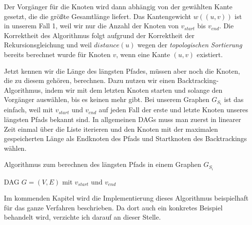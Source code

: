 Der Vorgänger für die Knoten wird dann abhängig von der gewählten Kante gesetzt, die die größte Gesamtlänge liefert. Das Kantengewicht $w((u,v))$ ist in unserem Fall 1, weil wir nur die Anzahl der Knoten von $v_{start}$ bis $v_{end}$. Die Korrektheit des Algorithmus folgt aufgrund der Korrektheit der Rekursionsgleichung und weil $distance(u)$ wegen der \emph{topologischen Sortierung} bereits berechnet wurde für Knoten $v$, wenn eine Kante $(u,v)$ existiert.

Jetzt kennen wir die Länge des längsten Pfades, müssen aber noch die Knoten, die zu diesem gehören, berechnen. Dazu nutzen wir einen Backtracking-Algorithmus, indem wir mit dem letzten Knoten starten und solange den Vorgänger auswählen, bis es keinen mehr gibt. Bei unserem Graphen $G_{S_i}$ ist das einfach, weil mit $v_{start}$ und $v_{end}$ auf jeden Fall der erste und letzte Knoten unseres längsten Pfads bekannt sind. In allgemeinen DAGs muss man zuerst in linearer Zeit einmal über die Liste iterieren und den Knoten mit der maximalen gespeicherten Länge als Endknoten des Pfads und Startknoten des Backtrackings wählen.

\begin{algorithm}
	\caption{Algorithmus zum berechnen des längsten Pfads in einem Graphen $G_{S_i}$}
	\label{alg:longestpath}
	\begin{algorithmic}[1]
		\Require DAG $G = (V,E)$ mit $v_{start}$ und $v_{end}$
			 
			\EndWhile
			 
			 
			\EndWhile
		\EndProcedure
	\end{algorithmic}
\end{algorithm}

Im kommenden Kapitel wird die Implementierung dieses Algorithmus beispielhaft für das ganze Verfahren beschrieben. Da dort auch ein konkretes Beispiel behandelt wird, verzichte ich darauf an dieser Stelle.

